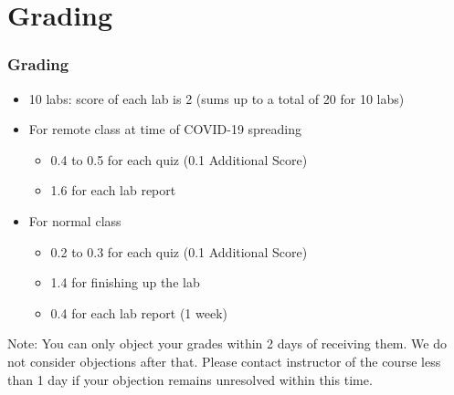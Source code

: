\documentclass[aspectratio=169,15pt]{beamer}
\begin{document}
\section{Grading}
\begin{frame}
    \frametitle{Grading}

    \begin{itemize}
        \item 10 labs: score of each lab is \alert{2} (sums up to a total of \alert{20} for 10 labs)
        \item For remote class at time of \alert{COVID-19} spreading
        \begin{itemize}
            \item {\color{red} 0.4} to {\color{red} 0.5} for each quiz (0.1 Additional Score)
            \item {\color{red} 1.6} for each lab report
        \end{itemize}
        \item For normal class
        \begin{itemize}
            \item {\color{red} 0.2} to {\color{red} 0.3} for each quiz (0.1 Additional Score)
            \item {\color{red} 1.4} for finishing up the lab
            \item {\color{red} 0.4} for each lab report (1 week)
        \end{itemize}
    \end{itemize}
    \begin{alertblock}{Note:}
        You can only object your grades within {\color{red} 2 days} of receiving them. We do not consider objections after that.
        Please contact instructor of the course less than {\color{red} 1 day} if your objection remains unresolved within this time.
    \end{alertblock}

\end{frame}
\end{document}
